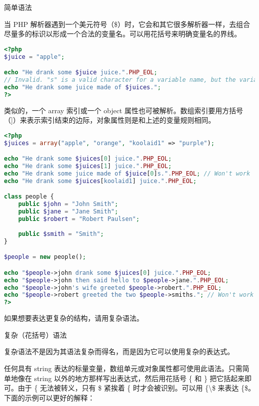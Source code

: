 \begin{compactitem}
\item 简单语法

当 PHP 解析器遇到一个美元符号（\$）时，它会和其它很多解析器一样，去组合尽量多的标识以形成一个合法的变量名。可以用花括号来明确变量名的界线。

\begin{lstlisting}[language=PHP]
<?php
$juice = "apple";

echo "He drank some $juice juice.".PHP_EOL;
// Invalid. "s" is a valid character for a variable name, but the variable is $juice.
echo "He drank some juice made of $juices.";
?>
\end{lstlisting}

类似的，一个 array 索引或一个 object 属性也可被解析。数组索引要用方括号（]）来表示索引结束的边际，对象属性则是和上述的变量规则相同。

\begin{lstlisting}[language=PHP]
<?php
$juices = array("apple", "orange", "koolaid1" => "purple");

echo "He drank some $juices[0] juice.".PHP_EOL;
echo "He drank some $juices[1] juice.".PHP_EOL;
echo "He drank some juice made of $juice[0]s.".PHP_EOL; // Won't work
echo "He drank some $juices[koolaid1] juice.".PHP_EOL;

class people {
    public $john = "John Smith";
    public $jane = "Jane Smith";
    public $robert = "Robert Paulsen";
    
    public $smith = "Smith";
}

$people = new people();

echo "$people->john drank some $juices[0] juice.".PHP_EOL;
echo "$people->john then said hello to $people->jane.".PHP_EOL;
echo "$people->john's wife greeted $people->robert.".PHP_EOL;
echo "$people->robert greeted the two $people->smiths."; // Won't work
?>
\end{lstlisting}

如果想要表达更复杂的结构，请用复杂语法。

\item 复杂（花括号）语法

复杂语法不是因为其语法复杂而得名，而是因为它可以使用复杂的表达式。

任何具有 string 表达的标量变量，数组单元或对象属性都可使用此语法。只需简单地像在 string 以外的地方那样写出表达式，然后用花括号 \{ 和 \} 把它括起来即可。由于 \{ 无法被转义，只有 \$ 紧挨着 \{ 时才会被识别。可以用 \{\textbackslash \$ 来表达 \{\$。下面的示例可以更好的解释：


\end{compactitem}

